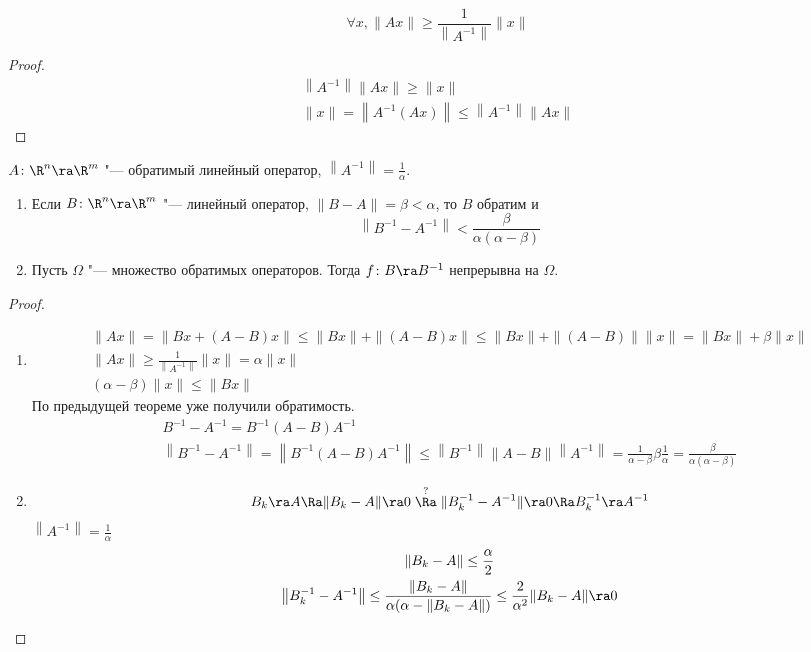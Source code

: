 \begin{Rem}
	\[ \forall x, \|Ax\| \ge \frac{1}{\left\|A^{-1}\right\|} \|x\| \]
\end{Rem}
\begin{proof}
	\begin{gather*}
		\left\| A^{-1} \right\| \|A x\| \ge \|x\| \\
		\|x\| = \left\|A^{-1} (Ax)\right\| \le \left\|A^{-1}\right\| \|A x\|
	\end{gather*}
\end{proof}

\begin{theorem}
	$A\colon \R^n \ra \R^m$ "--- обратимый линейный оператор, $\left\|A^{-1}\right\| = \frac1\alpha$.
	\begin{enumerate}
	\item
		Если $B\colon \R^n \ra \R^m$ "--- линейный оператор, $\|B - A\| = \beta < \alpha$, то $B$ обратим и
		\[ \left\|B^{-1} - A^{-1}\right\| < \frac{\beta}{\alpha(\alpha - \beta)} \]

	\item
		Пусть $\Omega$ "--- множество обратимых операторов. Тогда $f\colon B \ra B^{-1}$ непрерывна на $\Omega$.
	\end{enumerate}
\end{theorem}
\begin{proof}
	\begin{enumerate}
	\item
		\begin{gather*}
			\|Ax\| = \|Bx + (A-B)x\| \le \|Bx\| + \|(A - B)x\| \le \|Bx\| + \|(A - B)\| \|x\| = \|Bx\| + \beta \|x\| \\
			\|Ax\| \ge \frac{1}{\left\|A^{-1}\right\|} \|x\| = \alpha \|x\| \\
			(\alpha - \beta) \|x\| \le \|Bx\|
		\end{gather*}
		По предыдущей теореме уже получили обратимость.
		\begin{gather*}
			B^{-1} - A^{-1} = B^{-1} (A - B) A^{-1} \\
			\left\|B^{-1} - A^{-1}\right\| = \left\|B^{-1} (A - B) A^{-1}\right\| \le \left\|B^{-1}\right\| \|A - B\| \left\|A^{-1}\right\|
				= \frac1{\alpha - \beta}\beta\frac1\alpha = \frac{\beta}{\alpha(\alpha - \beta)}
		\end{gather*}

	\item
		\[ B_k \ra A \Ra \|B_k - A\| \ra 0 \stackrel{?}{\Ra} \|B_k^{-1} - A^{-1}\| \ra 0 \Ra B_k^{-1} \ra A^{-1} \]
		$\left\|A^{-1}\right\| = \frac1\alpha$
		\begin{gather*}
			\|B_k - A\| \le \frac{\alpha}2 \\
			\left\|B_k^{-1} - A^{-1}\right\| \le \frac{\|B_k - A\|}{\alpha(\alpha - \|B_k - A\|)} \le \frac{2}{\alpha^2} \|B_k - A\| \ra 0
		\end{gather*}
	\end{enumerate}
\end{proof}

